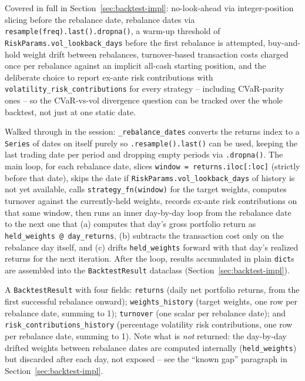 \documentclass[11pt]{article}
\begin{document}
\begin{description}[style=nextline,leftmargin=0pt]
\item[Q: Implement \texttt{run\_backtest}, and explain every design choice made along the way.]
Covered in full in Section~\ref{sec:backtest-impl}: no-look-ahead via
integer-position slicing before the rebalance date, rebalance dates via
\texttt{resample(freq).last().dropna()}, a warm-up threshold of
\texttt{RiskParams.vol\_lookback\_days} before the first rebalance is
attempted, buy-and-hold weight drift between rebalances, turnover-based
transaction costs charged once per rebalance against an implicit
all-cash starting position, and the deliberate choice to report
ex-ante risk contributions with \texttt{volatility\_risk\_contributions}
for every strategy -- including CVaR-parity ones -- so the CVaR-vs-vol
divergence question can be tracked over the whole backtest, not just at
one static date.

\item[Q: Explain \texttt{run\_backtest} line by line.]
Walked through in the session: \texttt{\_rebalance\_dates} converts the
returns index to a \texttt{Series} of dates on itself purely so
\texttt{.resample().last()} can be used, keeping the last trading date
per period and dropping empty periods via \texttt{.dropna()}. The main
loop, for each rebalance date, slices \texttt{window = returns.iloc[:loc]}
(strictly before that date), skips the date if
\texttt{RiskParams.vol\_lookback\_days} of history is not yet available,
calls \texttt{strategy\_fn(window)} for the target weights, computes
turnover against the currently-held weights, records ex-ante risk
contributions on that same window, then runs an inner day-by-day loop
from the rebalance date to the next one that (a) computes that day's
gross portfolio return as \texttt{held\_weights @ day\_returns}, (b)
subtracts the transaction cost only on the rebalance day itself, and
(c) drifts \texttt{held\_weights} forward with that day's realized
returns for the next iteration. After the loop, results accumulated in
plain \texttt{dict}s are assembled into the \texttt{BacktestResult}
dataclass (Section~\ref{sec:backtest-impl}).

\item[Q: What exactly does \texttt{run\_backtest} return?]
A \texttt{BacktestResult} with four fields: \texttt{returns} (daily net
portfolio returns, from the first successful rebalance onward);
\texttt{weights\_history} (target weights, one row per rebalance date,
summing to 1); \texttt{turnover} (one scalar per rebalance date); and
\texttt{risk\_contributions\_history} (percentage volatility risk
contributions, one row per rebalance date, summing to 1). Note what is
\emph{not} returned: the day-by-day drifted weights between rebalance
dates are computed internally (\texttt{held\_weights}) but discarded
after each day, not exposed -- see the ``known gap'' paragraph in
Section~\ref{sec:backtest-impl}.


\end{description}
\end{document}
